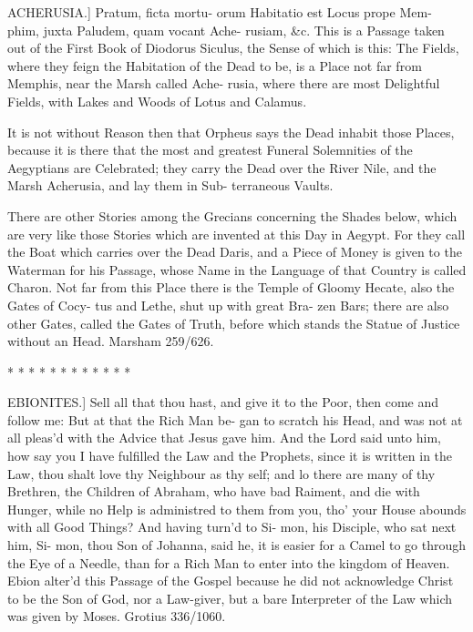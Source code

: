 ACHERUSIA.] Pratum, ficta mortu-
orum Habitatio est Locus prope Mem-
phim, juxta Paludem, quam vocant Ache-
rusiam, &c. This is a Passage taken out
of the First Book of Diodorus Siculus,
the Sense of which is this: The Fields,
where they feign the Habitation of the
Dead to be, is a Place not far from
Memphis, near the Marsh called Ache-
rusia, where there are most Delightful
Fields, with Lakes and Woods of Lotus
and Calamus.

It is not without Reason then that
Orpheus says the Dead inhabit those
Places, because it is there that the most
and greatest Funeral Solemnities of the
Aegyptians are Celebrated; they carry
the Dead over the River Nile, and the
Marsh Acherusia, and lay them in Sub-
terraneous Vaults.

There are other Stories among the
Grecians concerning the Shades below,
which are very like those Stories which
are invented at this Day in Aegypt. For
they call the Boat which carries over the
Dead Daris, and a Piece of Money is
given to the Waterman for his Passage,
whose Name in the Language of that
Country is called Charon. Not far from
this Place there is the Temple of
Gloomy Hecate, also the Gates of Cocy-
tus and Lethe, shut up with great Bra-
zen Bars; there are also other Gates,
called the Gates of Truth, before which
stands the Statue of Justice without an
Head. Marsham 259/626.

                *
               * *
            * *    *
             *    * *
               * *
                *

EBIONITES.] Sell all that thou hast,
and give it to the Poor, then come and
follow me: But at that the Rich Man be-
gan to scratch his Head, and was not at
all pleas'd with the Advice that Jesus
gave him. And the Lord said unto him,
how say you I have fulfilled the Law and
the Prophets, since it is written in the
Law, thou shalt love thy Neighbour as
thy self; and lo there are many of thy
Brethren, the Children of Abraham, who
have bad Raiment, and die with Hunger,
while no Help is administred to them
from you, tho' your House abounds with all
Good Things? And having turn'd to Si-
mon, his Disciple, who sat next him, Si-
mon, thou Son of Johanna, said he, it
is easier for a Camel to go through the
Eye of a Needle, than for a Rich Man
to enter into the kingdom of Heaven.
Ebion alter'd this Passage of the Gospel
because he did not acknowledge Christ
to be the Son of God, nor a Law-giver,
but a bare Interpreter of the Law which
was given by Moses. Grotius 336/1060.


